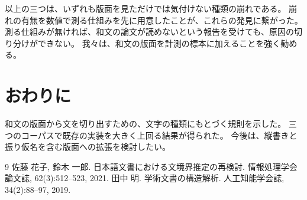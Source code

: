 \documentclass[10pt,a4paper,twocolumn]{article}
\newcommand{\s}[1]{#1}
\begin{document}
\s{以上の三つは、いずれも版面を見ただけでは気付けない種類の崩れである。}%
\s{崩れの有無を数値で測る仕組みを先に用意したことが、これらの発見に繋がった。}%
\s{測る仕組みが無ければ、和文の論文が読めないという報告を受けても、原因の切り分けができない。}%
\s{我々は、和文の版面を計測の標本に加えることを強く勧める。}%

\section{おわりに}

\s{和文の版面から文を切り出すための、文字の種類にもとづく規則を示した。}%
\s{三つのコーパスで既存の実装を大きく上回る結果が得られた。}%
\s{今後は、縦書きと振り仮名を含む版面への拡張を検討したい。}%

\begin{thebibliography}{9}
佐藤 花子, 鈴木 一郎. 日本語文書における文境界推定の再検討. 情報処理学会論文誌, 62(3):512--523, 2021.
田中 明. 学術文書の構造解析. 人工知能学会誌, 34(2):88--97, 2019.
\end{thebibliography}
\end{document}

